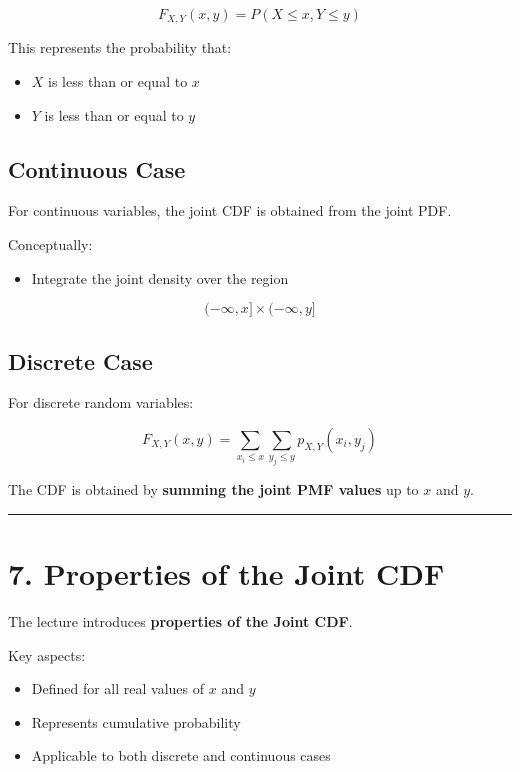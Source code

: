 \documentclass[12pt]{article}
\begin{document}
\[
F_{X,Y}(x,y) = P(X \le x, Y \le y)
\]

This represents the probability that:

\begin{itemize}
\item $X$ is less than or equal to $x$
\item $Y$ is less than or equal to $y$
\end{itemize}

\subsection*{Continuous Case}

For continuous variables, the joint CDF is obtained from the joint PDF.

Conceptually:

\begin{itemize}
\item Integrate the joint density over the region
\end{itemize}

\[
(-\infty, x] \times (-\infty, y]
\]

\subsection*{Discrete Case}

For discrete random variables:

\[
F_{X,Y}(x,y)
=
\sum_{x_i \le x} \sum_{y_j \le y}
p_{X,Y}(x_i,y_j)
\]

The CDF is obtained by \textbf{summing the joint PMF values} up to $x$ and $y$.

\hrule
\vspace{0.5cm}

\section*{7. Properties of the Joint CDF}

The lecture introduces \textbf{properties of the Joint CDF}.

Key aspects:

\begin{itemize}
\item Defined for all real values of $x$ and $y$
\item Represents cumulative probability
\item Applicable to both discrete and continuous cases
\end{itemize}
\end{document}
